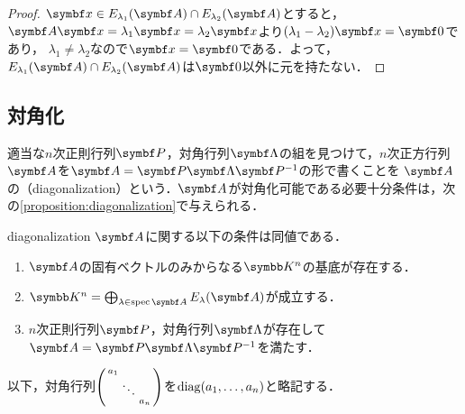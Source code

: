 \documentclass[../../main]{subfiles}
\begin{document}
\begin{proof}
  \(\vect{x}\in E_{\lambda_1}(\mat{A})\cap E_{\lambda_2}(\mat{A})\)とすると，\(\mat{A}\vect{x}=\lambda_1\vect{x}=\lambda_2\vect{x}\)より\((\lambda_1-\lambda_2)\vect{x}=\zvec\)であり，
  \(\lambda_1\neq\lambda_2\)なので\(\vect{x}=\zvec\)である．よって，\(E_{\lambda_1}(\mat{A})\cap E_{\lambda_2}(\mat{A})\)は\(\zvec\)以外に元を持たない．
\end{proof}

\subsection{対角化}

適当な\(n\)次正則行列\(\mat{P}\)，対角行列\(\mat{\Lambda}\)の組を見つけて，\(n\)次正方行列\(\mat{A}\)を\(\mat{A}=\mat{P}\mat{\Lambda}\mat{P}^{-1}\)の形で書くことを
\(\mat{A}\)の（diagonalization）という．\(\mat{A}\)が対角化可能である必要十分条件は，次の\cref{proposition:diagonalization}で与えられる．

\begin{proposition}{}{diagonalization}
  \(\mat{A}\)に関する以下の条件は同値である．
  \begin{enumerate}
    \item \(\mat{A}\)の固有ベクトルのみからなる\(\numset{K}^n\)の基底が存在する．
    \item \(\numset{K}^n=\bigoplus_{\lambda\in\spec\mat{A}}E_\lambda(\mat{A})\)が成立する．
    \item \(n\)次正則行列\(\mat{P}\)，対角行列\(\mat{\Lambda}\)が存在して\(\mat{A}=\mat{P}\mat{\Lambda}\mat{P}^{-1}\)を満たす．
  \end{enumerate}
\end{proposition}

以下，対角行列\(\begin{psmallmatrix}a_1 & & \\ & \ddots & \\ & & a_n\end{psmallmatrix}\)を\(\operatorname{diag}(a_1,\dots,a_n)\)と略記する．
\end{document}
